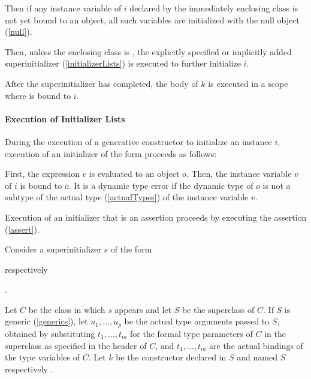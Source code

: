 \documentclass[makeidx]{article}
\begin{document}

\LMHash{}%
Then if any instance variable of $i$ declared by the immediately enclosing class
is not yet bound to an object,
all such variables are initialized with the null object (\ref{null}).

\LMHash{}%
Then, unless the enclosing class is , the explicitly specified or
implicitly added superinitializer (\ref{initializerLists}) is executed to
further initialize $i$.

\LMHash{}%
After the superinitializer has completed, the body of $k$ is executed in a scope where \THIS{} is bound to $i$.



\paragraph{Execution of Initializer Lists}

\LMHash{}%
During the execution of a generative constructor to initialize an instance $i$,
execution of an initializer of the form 
proceeds as follows:

\LMHash{}%
First, the expression $e$ is evaluated to an object $o$.
Then, the instance variable $v$ of $i$ is bound to $o$.
It is a dynamic type error if the dynamic type of $o$ is not
a subtype of the actual type
(\ref{actualTypes})
of the instance variable $v$.

\LMHash{}%
Execution of an initializer that is an assertion proceeds by executing the assertion (\ref{assert}).

\LMHash{}%
Consider a superinitializer $s$ of the form

respectively

.

\LMHash{}%
Let $C$ be the class in which $s$ appears and let $S$ be the superclass of $C$.
If $S$ is generic (\ref{generics}),
let $u_1, \ldots, u_p$ be the actual type arguments passed to $S$,
obtained by substituting $t_1, \ldots, t_m$
for the formal type parameters of $C$
in the superclass as specified in the header of $C$, and
$t_1, \ldots, t_m$
are the actual bindings of the type variables of $C$.
Let $k$ be the constructor declared in $S$ and named
$S$ respectively .
\end{document}
